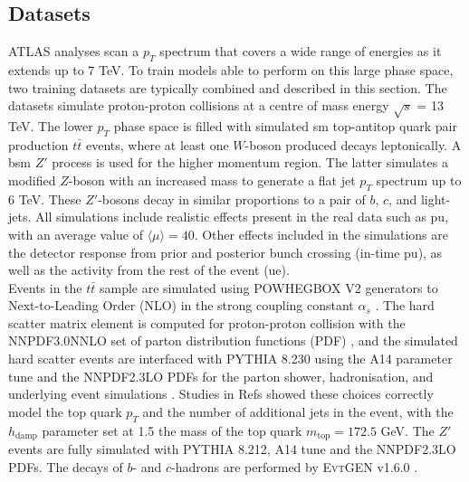 \subsection{Datasets}\label{ftagdatasets}
ATLAS analyses scan a $p_T$ spectrum that covers a wide range of energies as it extends up to 7 TeV. To train models able to perform on this large phase space, two training datasets are typically combined and described in this section. The datasets simulate proton-proton collisions at a centre of mass energy $\sqrt{s}$ = 13 TeV. The lower $p_T$ phase space is filled with simulated \gls{sm} top-antitop quark pair production $t\bar{t}$ events, where at least one $W$-boson produced decays leptonically. A \gls{bsm} $Z'$ process is used for the higher momentum region. The latter simulates a modified $Z$-boson with an increased mass to generate a flat jet $p_T$ spectrum up to 6 TeV. These $Z'$-bosons decay in similar proportions to a pair of $b$, $c$, and light-jets. All simulations include realistic effects present in the real data such as \gls{pu}, with an average value of $ \langle\mu\rangle = 40$. Other effects included in the simulations are the detector response from prior and posterior bunch crossing (in-time \gls{pu}), as well as the activity from the rest of the event (\gls{ue}). \\

Events in the $t\bar{t}$ sample are simulated using \textsc{POWHEGBOX V2} generators to Next-to-Leading Order (NLO) in the strong coupling constant $\alpha_s$ \cite{PaoloNason_2004, StefanoFrixione_2007, StefanoFrixione_20072, POWHEGBOX}. The hard scatter matrix element is computed for proton-proton collision with the \textsc{NNPDF3.0NNLO} set of parton distribution functions (PDF) \cite{PDFLHCrun2}, and the simulated hard scatter events are interfaced with \textsc{PYTHIA 8.230} \cite{SJOSTRAND2015159} using the A14 parameter tune \cite{ATL-PHYS-PUB-2014-021} and the \textsc{NNPDF2.3LO} PDFs for the parton shower, hadronisation, and underlying event simulations \cite{BALL2013244}. Studies in Refs \cite{ATL-PHYS-PUB-2016-020, ATL-PHYS-PUB-2020-023} showed these choices correctly model the top quark $p_T$ and the number of additional jets in the event, with the $h_{\textrm{damp}}$ parameter set at 1.5 the mass of the top quark $m_{\textrm{top}} = 172.5$ GeV. The $Z'$ events are fully simulated with \textsc{PYTHIA 8.212}, A14 tune and the \textsc{NNPDF2.3LO} PDFs. The decays of $b$- and $c$-hadrons are performed by \textsc{EvtGEN} v1.6.0 \cite{LANGE2001152}. \\

